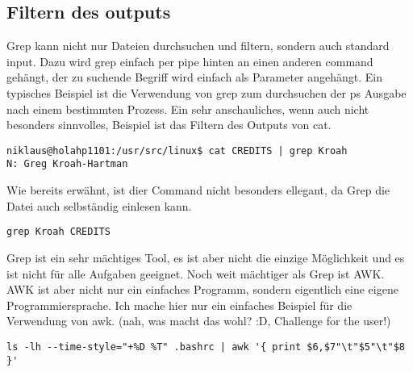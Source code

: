 \subsection{Filtern des outputs}
Grep kann nicht nur Dateien durchsuchen und filtern, sondern auch standard input. Dazu wird grep einfach per pipe hinten an einen anderen command geh\"angt, der zu suchende Begriff wird einfach als Parameter angeh\"angt. Ein typisches Beispiel ist die Verwendung von grep zum durchsuchen der ps Ausgabe nach einem bestimmten Prozess. Ein sehr anschauliches, wenn auch nicht besonders sinnvolles, Beispiel ist das Filtern des Outputs von cat.
\begin{lstlisting}[frame=single, style=Shell]
niklaus@holahp1101:/usr/src/linux$ cat CREDITS | grep Kroah
N: Greg Kroah-Hartman
\end{lstlisting}
Wie bereits erw\"ahnt, ist dier Command nicht besonders ellegant, da Grep die Datei auch selbst\"andig einlesen kann.
\begin{lstlisting}[frame=single, style=Shell]
grep Kroah CREDITS
\end{lstlisting}
Grep ist ein sehr m\"achtiges Tool, es ist aber nicht die einzige M\"oglichkeit und es ist nicht f\"ur alle Aufgaben geeignet. Noch weit m\"achtiger als Grep ist AWK. AWK ist aber nicht nur ein einfaches Programm, sondern eigentlich eine eigene Programmiersprache. Ich mache hier nur ein einfaches Beispiel f\"ur die Verwendung von awk. (nah, was macht das wohl? :D, Challenge for the user!)
\begin{lstlisting}[frame=single, style=Shell]
ls -lh --time-style="+%D %T" .bashrc | awk '{ print $6,$7"\t"$5"\t"$8 }'
\end{lstlisting}

